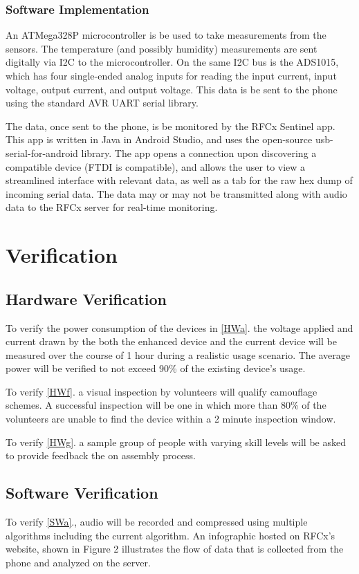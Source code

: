\documentclass{article}
\begin{document}
{\subsubsection{Software Implementation}
An ATMega328P microcontroller is be used to take measurements from the sensors. The temperature (and possibly humidity) measurements are sent digitally via I2C to the microcontroller. On the same I2C bus is the ADS1015, which has four single-ended analog inputs for reading the input current, input voltage, output current, and output voltage. This data is be sent to the phone using the standard AVR UART serial library.

The data, once sent to the phone, is be monitored by the RFCx Sentinel app. This app is written in Java in Android Studio, and uses the open-source usb-serial-for-android library. The app opens a connection upon discovering a compatible device (FTDI is compatible), and allows the user to view a streamlined interface with relevant data, as well as a tab for the raw hex dump of incoming serial data. The data may or may not be transmitted along with audio data to the RFCx server for real-time monitoring.


\section{Verification}
\subsection{Hardware Verification}
To verify the power consumption of the devices in \ref{HWa}. the voltage applied and current drawn by the both the enhanced device and the current device will be measured over the course of 1 hour during a realistic usage scenario. The average power will be verified to not exceed 90\% of the existing device’s usage.

To verify \ref{HWf}. a visual inspection by volunteers will qualify camouflage schemes. A successful inspection will be one in which more than 80\% of the volunteers are unable to find the device within a 2 minute inspection window.

To verify \ref{HWg}. a sample group of people with varying skill levels will be asked to provide feedback the on assembly process.

\subsection{Software Verification}
To verify \ref{SWa}., audio will be recorded and compressed using multiple algorithms including the current algorithm. An infographic hosted on RFCx’s website, shown in Figure 2 illustrates the flow of data that is collected from the phone and analyzed on the server.

}
\end{document}
